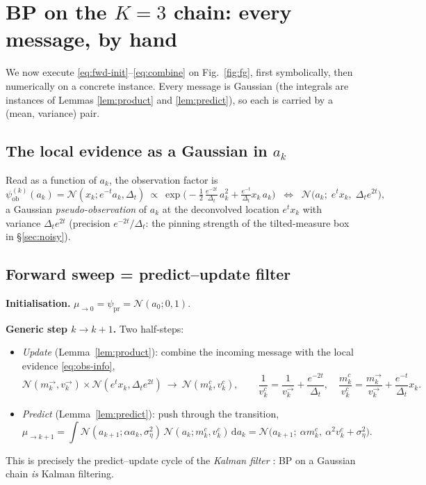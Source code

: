 \documentclass[11pt]{article}
\theoremstyle{definition}
\newcommand{\N}{\mathcal{N}}
\newcommand{\Dt}{\Delta_t}
\newcommand{\dd}{\mathrm{d}}
\begin{document}
\section{BP on the $K=3$ chain: every message, by hand}\label{sec:bp3}

We now execute \eqref{eq:fwd-init}--\eqref{eq:combine} on Fig.~\ref{fig:fg},
first symbolically, then numerically on a concrete instance. Every message is
Gaussian (the integrals are instances of Lemmas \ref{lem:product} and
\ref{lem:predict}), so each is carried by a (mean, variance) pair.

\subsection{The local evidence as a Gaussian in $a_k$}

Read as a function of $a_k$, the observation factor is
\begin{equation}\label{eq:obs-info}
  \psi^{(k)}_{\mathrm{ob}}(a_k)=\N(x_k;e^{-t}a_k,\Dt)\ \propto\
  \exp\!\Big(-\tfrac12\,\tfrac{e^{-2t}}{\Dt}\,a_k^2
  +\tfrac{e^{-t}}{\Dt}x_k\,a_k\Big)
  \;\;\Longleftrightarrow\;\;
  \N\!\big(a_k;\;e^{t}x_k,\;\Dt e^{2t}\big),
\end{equation}
a Gaussian \emph{pseudo-observation} of $a_k$ at the deconvolved location
$e^tx_k$ with variance $\Dt e^{2t}$ (precision $e^{-2t}/\Dt$: the pinning
strength of the tilted-measure box in \S\ref{sec:noisy}).

\subsection{Forward sweep = predict--update filter}

\begin{derivation}
\textbf{Initialisation.} $\mu_{\to0}=\psi_{\mathrm{pr}}=\N(a_0;0,1)$.

\textbf{Generic step $k\to k+1$.} Two half-steps:
\begin{itemize}[leftmargin=1.6em, topsep=2pt, itemsep=2pt]
\item \emph{Update} (Lemma~\ref{lem:product}): combine the incoming message
with the local evidence \eqref{eq:obs-info},
\[
  \N(m^{\to}_k,v^{\to}_k)\times\N(e^tx_k,\Dt e^{2t})
  \ \longrightarrow\
  \N(m^c_k,v^c_k),\qquad
  \frac1{v^c_k}=\frac1{v^{\to}_k}+\frac{e^{-2t}}{\Dt},\quad
  \frac{m^c_k}{v^c_k}=\frac{m^{\to}_k}{v^{\to}_k}+\frac{e^{-t}}{\Dt}x_k .
\]
\item \emph{Predict} (Lemma~\ref{lem:predict}): push through the transition,
\[
  \mu_{\to k+1}=\int\N(a_{k+1};\alpha a_k,\sigma_\eta^2)\,
   \N(a_k;m^c_k,v^c_k)\,\dd a_k
  =\N\!\big(a_{k+1};\ \alpha m^c_k,\ \alpha^2v^c_k+\sigma_\eta^2\big).
\]
\end{itemize}
This is precisely the predict--update cycle of the \emph{Kalman filter}
\citep{kalman1960}: BP on a Gaussian chain \emph{is} Kalman filtering.
\end{derivation}
\end{document}
